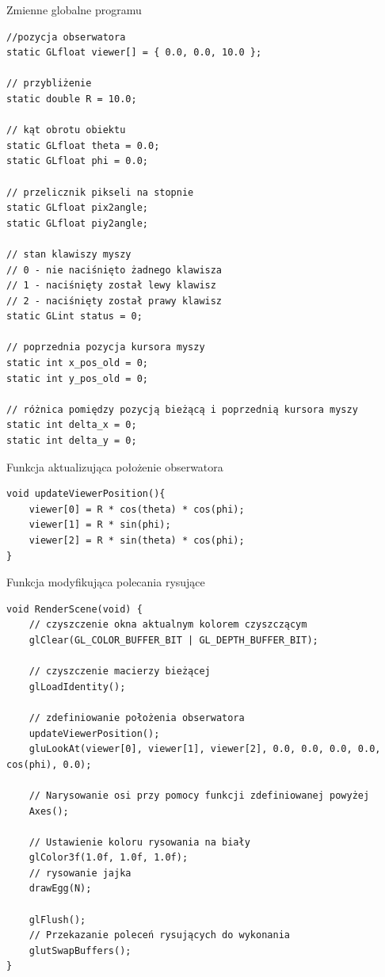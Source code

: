 \documentclass[12pt,a4paper,titlepage]{article}
\begin{document}
\begin{listing}[H]
\caption{Zmienne globalne programu}
\begin{verbatim}
//pozycja obserwatora
static GLfloat viewer[] = { 0.0, 0.0, 10.0 };

// przybliżenie
static double R = 10.0;

// kąt obrotu obiektu
static GLfloat theta = 0.0;
static GLfloat phi = 0.0;

// przelicznik pikseli na stopnie
static GLfloat pix2angle;
static GLfloat piy2angle;

// stan klawiszy myszy 
// 0 - nie naciśnięto żadnego klawisza
// 1 - naciśnięty został lewy klawisz
// 2 - naciśnięty został prawy klawisz
static GLint status = 0;
							   
// poprzednia pozycja kursora myszy
static int x_pos_old = 0; 
static int y_pos_old = 0;

// różnica pomiędzy pozycją bieżącą i poprzednią kursora myszy
static int delta_x = 0;
static int delta_y = 0;
\end{verbatim}
\end{listing}

\begin{listing}
\caption{Funkcja aktualizująca położenie obserwatora}
\begin{verbatim}
void updateViewerPosition(){
    viewer[0] = R * cos(theta) * cos(phi);
    viewer[1] = R * sin(phi);
    viewer[2] = R * sin(theta) * cos(phi);
}
\end{verbatim}
\end{listing}

\begin{listing}[H]
\caption{Funkcja modyfikująca polecania rysujące}
\begin{verbatim}
void RenderScene(void) {
    // czyszczenie okna aktualnym kolorem czyszczącym
    glClear(GL_COLOR_BUFFER_BIT | GL_DEPTH_BUFFER_BIT);
    
    // czyszczenie macierzy bieżącej
    glLoadIdentity();
    
    // zdefiniowanie położenia obserwatora
    updateViewerPosition();
    gluLookAt(viewer[0], viewer[1], viewer[2], 0.0, 0.0, 0.0, 0.0, cos(phi), 0.0);
    
    // Narysowanie osi przy pomocy funkcji zdefiniowanej powyżej
    Axes();

    // Ustawienie koloru rysowania na biały
    glColor3f(1.0f, 1.0f, 1.0f);
    // rysowanie jajka
    drawEgg(N);

    glFlush();
    // Przekazanie poleceń rysujących do wykonania
    glutSwapBuffers();
}
\end{verbatim}
\end{listing}
\end{document}
